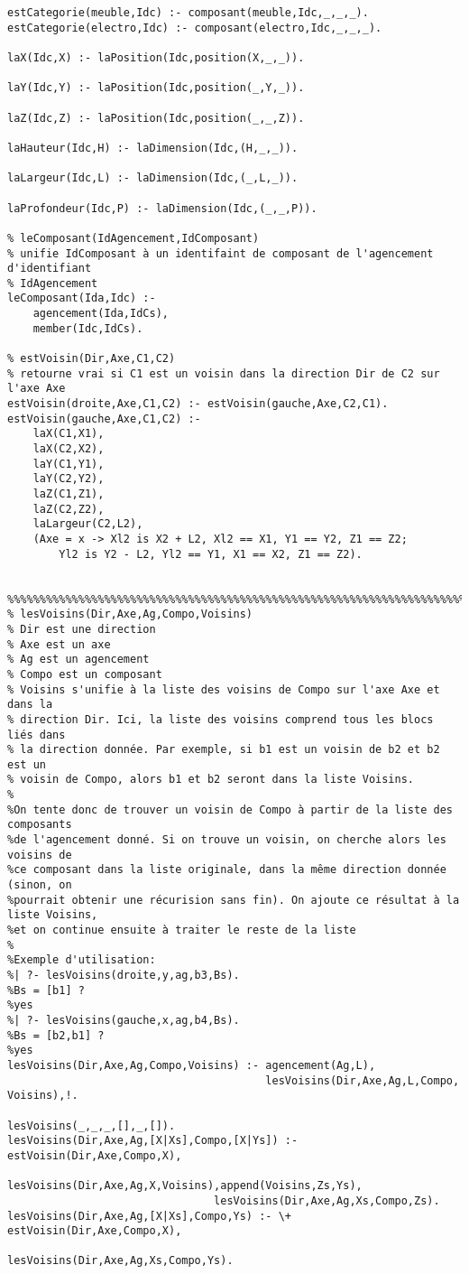 \documentclass[letterpaper,11pt]{letter}
\begin{document}
\begin{verbatim}
estCategorie(meuble,Idc) :- composant(meuble,Idc,_,_,_).
estCategorie(electro,Idc) :- composant(electro,Idc,_,_,_).

laX(Idc,X) :- laPosition(Idc,position(X,_,_)).

laY(Idc,Y) :- laPosition(Idc,position(_,Y,_)).

laZ(Idc,Z) :- laPosition(Idc,position(_,_,Z)).

laHauteur(Idc,H) :- laDimension(Idc,(H,_,_)).

laLargeur(Idc,L) :- laDimension(Idc,(_,L,_)).

laProfondeur(Idc,P) :- laDimension(Idc,(_,_,P)).

% leComposant(IdAgencement,IdComposant)
% unifie IdComposant à un identifaint de composant de l'agencement d'identifiant
% IdAgencement
leComposant(Ida,Idc) :-
	agencement(Ida,IdCs),
	member(Idc,IdCs).

% estVoisin(Dir,Axe,C1,C2)
% retourne vrai si C1 est un voisin dans la direction Dir de C2 sur l'axe Axe
estVoisin(droite,Axe,C1,C2) :- estVoisin(gauche,Axe,C2,C1).
estVoisin(gauche,Axe,C1,C2) :-
	laX(C1,X1),
	laX(C2,X2),
	laY(C1,Y1),
	laY(C2,Y2),
	laZ(C1,Z1),
	laZ(C2,Z2),
	laLargeur(C2,L2),
	(Axe = x -> Xl2 is X2 + L2, Xl2 == X1, Y1 == Y2, Z1 == Z2;
	    Yl2 is Y2 - L2, Yl2 == Y1, X1 == X2, Z1 == Z2).


%%%%%%%%%%%%%%%%%%%%%%%%%%%%%%%%%%%%%%%%%%%%%%%%%%%%%%%%%%%%%%%%%%%%%%%%%%%%%%%%
% lesVoisins(Dir,Axe,Ag,Compo,Voisins)
% Dir est une direction
% Axe est un axe
% Ag est un agencement
% Compo est un composant 
% Voisins s'unifie à la liste des voisins de Compo sur l'axe Axe et dans la 
% direction Dir. Ici, la liste des voisins comprend tous les blocs liés dans
% la direction donnée. Par exemple, si b1 est un voisin de b2 et b2 est un 
% voisin de Compo, alors b1 et b2 seront dans la liste Voisins.
%
%On tente donc de trouver un voisin de Compo à partir de la liste des composants
%de l'agencement donné. Si on trouve un voisin, on cherche alors les voisins de
%ce composant dans la liste originale, dans la même direction donnée (sinon, on
%pourrait obtenir une récurision sans fin). On ajoute ce résultat à la liste Voisins,
%et on continue ensuite à traiter le reste de la liste 
%
%Exemple d'utilisation:
%| ?- lesVoisins(droite,y,ag,b3,Bs).
%Bs = [b1] ? 
%yes
%| ?- lesVoisins(gauche,x,ag,b4,Bs).
%Bs = [b2,b1] ? 
%yes
lesVoisins(Dir,Axe,Ag,Compo,Voisins) :- agencement(Ag,L),
                                        lesVoisins(Dir,Axe,Ag,L,Compo, Voisins),!.

lesVoisins(_,_,_,[],_,[]).
lesVoisins(Dir,Axe,Ag,[X|Xs],Compo,[X|Ys]) :- estVoisin(Dir,Axe,Compo,X),
                                lesVoisins(Dir,Axe,Ag,X,Voisins),append(Voisins,Zs,Ys),
                                lesVoisins(Dir,Axe,Ag,Xs,Compo,Zs).
lesVoisins(Dir,Axe,Ag,[X|Xs],Compo,Ys) :- \+ estVoisin(Dir,Axe,Compo,X),
                                                lesVoisins(Dir,Axe,Ag,Xs,Compo,Ys).


\end{verbatim}
\end{document}
